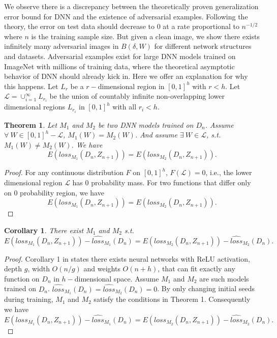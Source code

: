 \documentclass[12pt]{article}
\newtheorem{theorem}{Theorem}
\newtheorem{corollary}{Corollary}[theorem]
\begin{document}
We observe there is a discrepancy between the theoretically proven
generalization error bound for DNN and the existence of adversarial
examples. Following the theory, the error on test data should
decrease to 0 at a rate proportional to $n^{-1/2}$ where $n$ is the
training sample size. But given a clean
image, we show there exists infinitely many adversarial images in
$B(\delta,W)$ for different network structures and
datasets. Adversarial examples exist for large DNN models trained on
ImageNet with millions of training data, where the theoretical
asymptotic behavior of DNN should already kick in. Here we offer an
explanation for why this happens. 
Let $L_r$ be a $r-$dimensional region in $[0,1]^h$ with $r<h$. Let
$\mathcal{L} = \cup_{i=1}^{\infty} L_{r_i}$ 
be the union of countably infinite non-overlapping lower dimensional
regions $L_{r_i}$ in  $[0,1]^h$ with all $r_i<h$.

%
\begin{theorem}
Let $M_1$ and $M_2$ be two DNN
models trained on $D_n$. Assume $\forall~ W \in [0,1]^h-\mathcal{L}$,
$M_1(W)= M_2(W)$. And assume $\exists~ W \in \mathcal{L}$, s.t.
$M_1(W) \neq  M_2(W)$. We have
$$E(loss_{M_1}(D_n,Z_{n+1})) = E(loss_{M_2}(D_n,Z_{n+1})).$$
\end{theorem}

\begin{proof}
For any continuous distribution $F$ on $[0,1]^h$,
$F(\mathcal{L})=0$, i.e., the lower dimensional region $\mathcal{L}$
has 0 probability mass. For two functions that differ only on 0
probability region, we have
$$E(loss_{M_1}(D_n,Z_{n+1})) = E(loss_{M_2}(D_n,Z_{n+1})).$$
\end{proof}

%
\begin{corollary}
There exist $M_1$ and $M_2$ s.t.    
%
$$E(loss_{M_1}(D_n,Z_{n+1})) - \hat{loss}_{M_1}(D_n) =
E(loss_{M_2}(D_n,Z_{n+1})) - \hat{loss}_{M_2}(D_n).$$  
\end{corollary}

\begin{proof}
Corollary 1 in \cite{ge-rethink-2017} states there exists neural networks
with  ReLU activation, depth $g$, width $O(n/g)$ and weights
$O(n+h)$, that can fit exactly any function on $D_n$ in $h-$dimensional
space. Assume $M_1$ and $M_2$ are such models trained on
$D_n$. $\hat{loss}_{M_1}(D_n)=\hat{loss}_{M_2}(D_n)=0$. 
By only changing initial seeds during training, $M_1$ and $M_2$
satisfy the conditions in Theorem 1.  
Consequently we have 
%
$$E(loss_{M_1}(D_n,Z_{n+1})) - \hat{loss}_{M_1}(D_n) =
E(loss_{M_2}(D_n,Z_{n+1})) - \hat{loss}_{M_2}(D_n).$$
\end{proof}  
\end{document}
